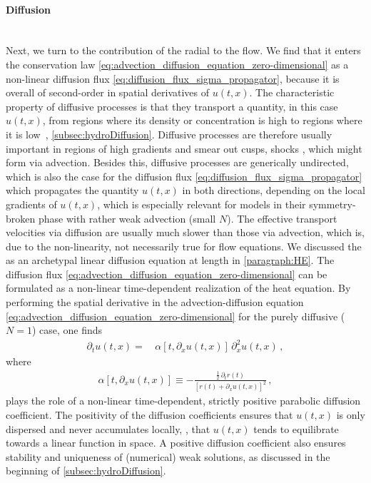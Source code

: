 \paragraph{Diffusion}\label{paragraph:conservative_form_diffusion}\mbox{}\\
Next, we turn to the contribution of the radial \sigmaMode{} to the \frg{} flow. 
We find that it enters the conservation law \eqref{eq:advection_diffusion_equation_zero-dimensional} as a non-linear diffusion flux \eqref{eq:diffusion_flux_sigma_propagator}, because it is overall of second-order in spatial derivatives of $u ( t, x )$. 
The characteristic property of diffusive processes is that they transport a quantity, in this case $u ( t, x )$, from regions where its density or concentration is high to regions where it is low~\cite{LeVeque:1992,LeVeque:2002,RezzollaZanotti:2013,Ames:1992}, \cf{} \cref{subsec:hydroDiffusion}.
Diffusive processes are therefore usually important in regions of high gradients and smear out cusps, shocks \etc{}, which might form via advection.
Besides this, diffusive processes are generically undirected, which is also the case for the diffusion flux \eqref{eq:diffusion_flux_sigma_propagator} which propagates the quantity $u ( t, x )$ in both directions, depending on the local gradients of $u ( t, x )$, which is especially relevant for models in their symmetry-broken phase with rather weak advection (small $N$). 
The effective transport velocities via diffusion are usually much slower than those via advection, which is, due to the non-linearity, not necessarily true for \frg{} flow equations.
We discussed the \heq{} as an archetypal linear diffusion equation at length in \cref{paragraph:HE}.
The diffusion flux \eqref{eq:advection_diffusion_equation_zero-dimensional} can be formulated as a non-linear time-dependent realization of the heat equation.
By performing the spatial derivative in the advection-diffusion equation \eqref{eq:advection_diffusion_equation_zero-dimensional} for the purely diffusive ($N = 1$) case, one finds
\begin{align}
	\partial_t u ( t, x ) = \, & \alpha[t,\partial_x u ( t, x )] \, \partial_x^2 u ( t, x ) \, ,\label{eq:0ddifprim}
\end{align}
where
\begin{align}
	\alpha[t,\partial_x u ( t, x )] \equiv - \frac{\tfrac{1}{2} \, \partial_t r ( t )}{[ r ( t ) + \partial_x u ( t, x ) ]^2} \, ,	\label{eq:diffusion_coefficient}
\end{align}
plays the role of a non-linear time-dependent, strictly positive \dash{} parabolic \dash{} diffusion coefficient. 
The positivity of the diffusion coefficients ensures that $u ( t, x )$ is only dispersed and never accumulates locally, \ie{}, that $u ( t, x )$ tends to equilibrate towards a linear function in space. 
A positive diffusion coefficient also ensures stability and uniqueness of (numerical) weak solutions, as discussed in the beginning of \cref{subsec:hydroDiffusion}.

